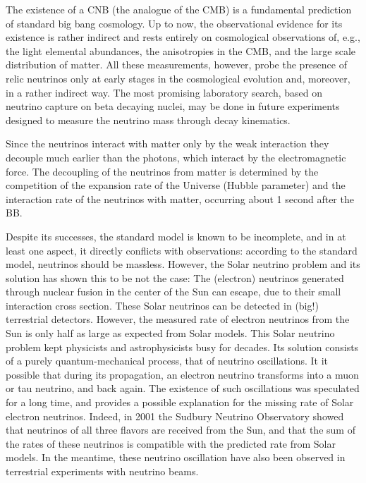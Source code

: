\documentclass[a4paper,11pt]{article}
\begin{document}
{\noindent}The existence of a CNB (the analogue of the CMB) is a fundamental prediction of standard big bang cosmology. Up to now, the observational evidence for its existence is rather indirect and rests entirely on cosmological observations of, e.g., the light elemental abundances, the anisotropies in the CMB, and the large scale distribution of matter. All these measurements, however, probe the presence of relic neutrinos only at early stages in the cosmological evolution and, moreover, in a rather indirect way. The most promising laboratory search, based on neutrino capture on beta decaying nuclei, may be done in future experiments designed to measure the neutrino mass through decay kinematics.

{\noindent}Since the neutrinos interact with matter only by the weak interaction they decouple much earlier than the photons, which interact by the electromagnetic force. The decoupling of the neutrinos from matter is determined by the competition of the expansion rate of the Universe (Hubble parameter) and the interaction rate of the neutrinos with matter, occurring about 1 second after the BB.

{\noindent}Despite its successes, the standard model is known to be incomplete, and in at least one aspect, it directly conflicts with observations: according to the standard model, neutrinos should be massless. However, the Solar neutrino problem and its solution has shown this to be not the case: The (electron) neutrinos generated through nuclear fusion in the center of the Sun can escape, due to their small interaction cross section. These Solar neutrinos can be detected in (big!) terrestrial detectors. However, the measured rate of electron neutrinos from the Sun is only half as large as expected from Solar models. This Solar neutrino problem kept physicists and astrophysicists busy for decades. Its solution consists of a purely quantum-mechanical process, that of neutrino oscillations. It it possible that during its propagation, an electron neutrino transforms into a muon or tau neutrino, and back again. The existence of such oscillations was speculated for a long time, and provides a possible explanation for the missing rate of Solar electron neutrinos. Indeed, in 2001 the Sudbury Neutrino Observatory showed that neutrinos of all three flavors are received from the Sun, and that the sum of the rates of these neutrinos is compatible with the predicted rate from Solar models. In the meantime, these neutrino oscillation have also been observed in terrestrial experiments with neutrino beams.
\end{document}
